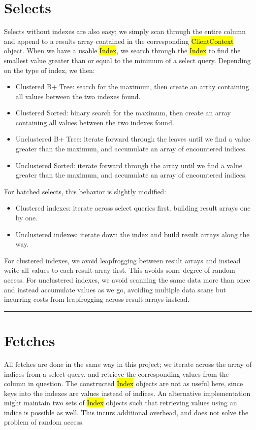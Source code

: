 \documentclass[paper=letter, fontsize=11pt]{scrartcl}
\numberwithin{equation}{section}
\numberwithin{figure}{section}
\numberwithin{table}{section}
\newcommand{\horrule}[1]{\rule{\linewidth}{#1}}
\newcommand{\ttt}[1]{\hl{\ttfamily #1}}
\begin{document}
\section{Selects}
Selects without indexes are also easy; we simply scan through the entire column and append to a results array contained in the corresponding \ttt{ClientContext} object.  When we have a usable \ttt{Index}, we search through the \ttt{Index} to find the smallest value greater than or equal to the minimum of a select query.  Depending on the type of index, we then:
\begin{itemize}
\item Clustered B+ Tree: search for the maximum, then create an array containing all values between the two indexes found.
\item Clustered Sorted: binary search for the maximum, then create an array containing all values between the two indexes found.
\item Unclustered B+ Tree: iterate forward through the leaves until we find a value greater than the maximum, and accumulate an array of encountered indices.
\item Unclustered Sorted: iterate forward through the array until we find a value greater than the maximum, and accumulate an array of encountered indices.
\end{itemize}

For batched selects, this behavior is slightly modified:
\begin{itemize}
\item Clustered indexes: iterate across select queries first, building result arrays one by one.
\item Unclustered indexes: iterate down the index and build result arrays along the way.
\end{itemize}
For clustered indexes, we avoid leapfrogging between result arrays and instead write all values to each result array first.  This avoids some degree of random access.  For unclustered indexes, we avoid scanning the same data more than once and instead accumulate values as we go, avoiding multiple data scans but incurring costs from leapfrogging across result arrays instead.

\horrule{0.5pt}
\section{Fetches}
All fetches are done in the same way in this project; we iterate across the array of indices from a select query, and retrieve the corresponding values from the column in question.  The constructed \ttt{Index} objects are not as useful here, since keys into the indexes are values instead of indices.  An alternative implementation might maintain two sets of \ttt{Index} objects such that retrieving values using an indice is possible as well.  This incurs additional overhead, and does not solve the problem of random access.
\end{document}
